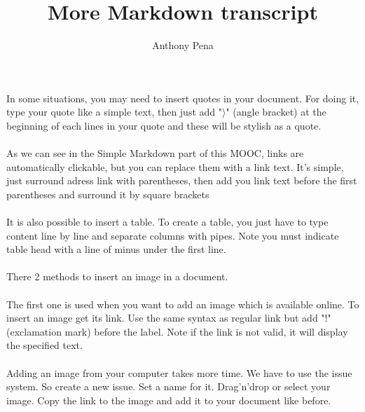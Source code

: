 \documentclass{article}
\title{More Markdown transcript}
\author{Anthony Pena}
\date{}
\begin{document}
\maketitle

In some situations, you may need to insert quotes in your document.
For doing it, type your quote like a simple text, then just add "$\rangle$" (angle bracket) at the beginning of each lines in your quote and these will be stylish as a quote.
\\\\
As we can see in the Simple Markdown part of this MOOC, links are automatically clickable, but you can replace them with a link text.
It's simple, just surround adress link with parentheses, then add you link text before the first parentheses and surround it by square brackets 
\\\\
It is also possible to insert a table.
To create a table, you just have to type content line by line and separate columns with pipes.
Note you must indicate table head with a line of minus under the first line.
\\\\
There 2 methods to insert an image in a document.
\\\\
The first one is used when you want to add an image which is available online. 
To insert an image get its link.
Use the same syntax as regular link but add "!" (exclamation mark) before the label.
Note if the link is not valid, it will display the specified text.
\\\\
Adding an image from your computer takes more time.
We have to use the issue system.
So create a new issue.
Set a name for it.
Drag'n'drop or select your image.
Copy the link to the image and add it to your document like before.
\end{document}
